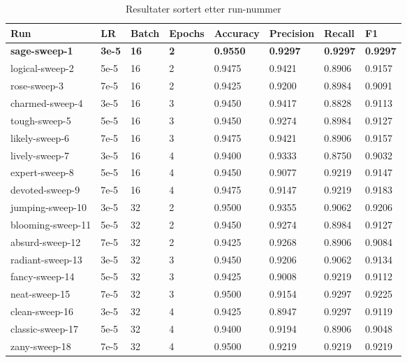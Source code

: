 \begin{table}
\caption{Resultater sortert etter run-nummer}
\label{tab:results}
\begin{tabular}{llllllll}
\toprule
Run & LR & Batch & Epochs & Accuracy & Precision & Recall & F1 \\
\midrule
\textbf{sage-sweep-1} & \textbf{3e-5} & \textbf{16} & \textbf{2} & \textbf{0.9550} & \textbf{0.9297} & \textbf{0.9297} & \textbf{0.9297} \\
logical-sweep-2 & 5e-5 & 16 & 2 & 0.9475 & 0.9421 & 0.8906 & 0.9157 \\
rose-sweep-3 & 7e-5 & 16 & 2 & 0.9425 & 0.9200 & 0.8984 & 0.9091 \\
charmed-sweep-4 & 3e-5 & 16 & 3 & 0.9450 & 0.9417 & 0.8828 & 0.9113 \\
tough-sweep-5 & 5e-5 & 16 & 3 & 0.9450 & 0.9274 & 0.8984 & 0.9127 \\
likely-sweep-6 & 7e-5 & 16 & 3 & 0.9475 & 0.9421 & 0.8906 & 0.9157 \\
lively-sweep-7 & 3e-5 & 16 & 4 & 0.9400 & 0.9333 & 0.8750 & 0.9032 \\
expert-sweep-8 & 5e-5 & 16 & 4 & 0.9450 & 0.9077 & 0.9219 & 0.9147 \\
devoted-sweep-9 & 7e-5 & 16 & 4 & 0.9475 & 0.9147 & 0.9219 & 0.9183 \\
jumping-sweep-10 & 3e-5 & 32 & 2 & 0.9500 & 0.9355 & 0.9062 & 0.9206 \\
blooming-sweep-11 & 5e-5 & 32 & 2 & 0.9450 & 0.9274 & 0.8984 & 0.9127 \\
absurd-sweep-12 & 7e-5 & 32 & 2 & 0.9425 & 0.9268 & 0.8906 & 0.9084 \\
radiant-sweep-13 & 3e-5 & 32 & 3 & 0.9450 & 0.9206 & 0.9062 & 0.9134 \\
fancy-sweep-14 & 5e-5 & 32 & 3 & 0.9425 & 0.9008 & 0.9219 & 0.9112 \\
neat-sweep-15 & 7e-5 & 32 & 3 & 0.9500 & 0.9154 & 0.9297 & 0.9225 \\
clean-sweep-16 & 3e-5 & 32 & 4 & 0.9425 & 0.8947 & 0.9297 & 0.9119 \\
classic-sweep-17 & 5e-5 & 32 & 4 & 0.9400 & 0.9194 & 0.8906 & 0.9048 \\
zany-sweep-18 & 7e-5 & 32 & 4 & 0.9500 & 0.9219 & 0.9219 & 0.9219 \\
\bottomrule
\end{tabular}
\end{table}
